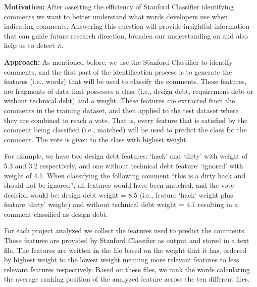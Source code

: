 
\vspace{3mm}
\noindent\rqii
\vspace{3mm}

\noindent \textbf{Motivation:} After asserting the efficiency of Stanford Classifier identifying \SATD comments we want to better understand what words developers use when indicating \SATD comments. Answering this question will provide insightful information that can guide future research direction, broaden our understanding on \SATD and also help us to detect it.     

\vspace{1mm}
\noindent \textbf{Approach:} As mentioned before, we use the Stanford Classifier to identify \SATD comments, and the first part of the identification process is to generate the features (i.e., words) that will be used to classify the comments. These features, are fragments of data that possesses a class (i.e., design debt, requirement debt or without technical debt) and a weight. These features are extracted from the comments in the training dataset, and then applied to the test dataset where they are combined to reach a vote. That is, every feature that is satisfied by the comment being classified (i.e., matched) will be used to predict the class for the comment. The vote is given to the class with highest weight. 

For example, we have two design debt features: `hack' and `dirty' with weight of 5.3 and 3.2 respectively, and one without technical debt feature: `ignored' with weight of 4.1. When classifying the following comment ``this is a dirty hack and should not be ignored'', all features would have been matched, and the vote decision would be: design debt weight = 8.5 (i.e., feature `hack' weight plus feature `dirty' weight) and without technical debt weight = 4.1 resulting in a comment classified as design debt.

For each project analyzed we collect the features used to predict the \SATD comments. These features are provided by Stanford Classifier as output and stored in a text file. The features are written in the file based on the weight that it has, ordered by highest weight to the lowest weight meaning more relevant features to less relevant features respectively. Based on these files, we rank the words calculating the average ranking position of the analyzed feature across the ten different files. 

